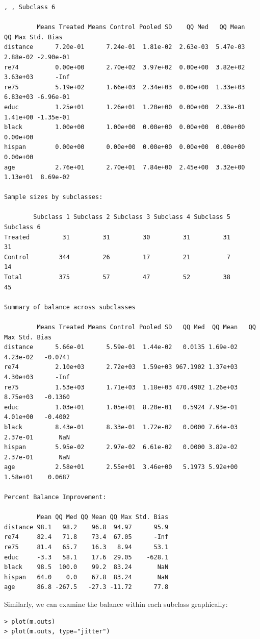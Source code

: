 \documentclass[oneside,letterpaper,titlepage]{article}
\begin{document}
\begin{verbatim}
, , Subclass 6

         Means Treated Means Control Pooled SD    QQ Med   QQ Mean    QQ Max Std. Bias
distance      7.20e-01      7.24e-01  1.81e-02  2.63e-03  5.47e-03  2.88e-02 -2.90e-01
re74          0.00e+00      2.70e+02  3.97e+02  0.00e+00  3.82e+02  3.63e+03      -Inf
re75          5.19e+02      1.66e+03  2.34e+03  0.00e+00  1.33e+03  6.83e+03 -6.96e-01
educ          1.25e+01      1.26e+01  1.20e+00  0.00e+00  2.33e-01  1.41e+00 -1.35e-01
black         1.00e+00      1.00e+00  0.00e+00  0.00e+00  0.00e+00  0.00e+00          
hispan        0.00e+00      0.00e+00  0.00e+00  0.00e+00  0.00e+00  0.00e+00          
age           2.76e+01      2.70e+01  7.84e+00  2.45e+00  3.32e+00  1.13e+01  8.69e-02
        
Sample sizes by subclasses:

        Subclass 1 Subclass 2 Subclass 3 Subclass 4 Subclass 5 Subclass 6
Treated         31         31         30         31         31         31
Control        344         26         17         21          7         14
Total          375         57         47         52         38         45

Summary of balance across subclasses

         Means Treated Means Control Pooled SD   QQ Med  QQ Mean   QQ Max Std. Bias
distance      5.66e-01      5.59e-01  1.44e-02   0.0135 1.69e-02 4.23e-02   -0.0741
re74          2.10e+03      2.72e+03  1.59e+03 967.1902 1.37e+03 4.30e+03      -Inf
re75          1.53e+03      1.71e+03  1.18e+03 470.4902 1.26e+03 8.75e+03   -0.1360
educ          1.03e+01      1.05e+01  8.20e-01   0.5924 7.93e-01 4.01e+00   -0.4002
black         8.43e-01      8.33e-01  1.72e-02   0.0000 7.64e-03 2.37e-01       NaN
hispan        5.95e-02      2.97e-02  6.61e-02   0.0000 3.82e-02 2.37e-01       NaN
age           2.58e+01      2.55e+01  3.46e+00   5.1973 5.92e+00 1.58e+01    0.0687
        
Percent Balance Improvement:

         Mean QQ Med QQ Mean QQ Max Std. Bias
distance 98.1   98.2    96.8  94.97      95.9
re74     82.4   71.8    73.4  67.05      -Inf
re75     81.4   65.7    16.3   8.94      53.1
educ     -3.3   58.1    17.6  29.05    -628.1
black    98.5  100.0    99.2  83.24       NaN
hispan   64.0    0.0    67.8  83.24       NaN
age      86.8 -267.5   -27.3 -11.72      77.8

\end{verbatim}
Similarly, we can examine the balance within each subclass graphically:
\begin{verbatim}
> plot(m.outs)
> plot(m.outs, type="jitter")
\end{verbatim}    
\end{document}
